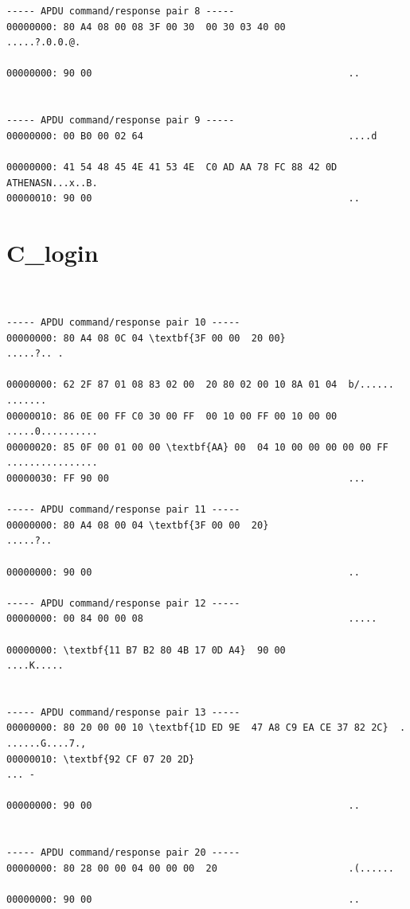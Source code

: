 \documentclass[bsc,frontabs,twoside,singlespacing,parskip,deptreport]{infthesis}     %
\begin{document}
\begin{appendices}
\begin{Verbatim}[commandchars=\\\{\}, fontsize=\small]
----- APDU command/response pair 8 -----
00000000: 80 A4 08 00 08 3F 00 30  00 30 03 40 00           .....?.0.0.@.

00000000: 90 00                                             ..


----- APDU command/response pair 9 -----
00000000: 00 B0 00 02 64                                    ....d

00000000: 41 54 48 45 4E 41 53 4E  C0 AD AA 78 FC 88 42 0D  ATHENASN...x..B.
00000010: 90 00                                             ..

\end{Verbatim}

\section{C\_login}
\begin{Verbatim}[commandchars=\\\{\}, fontsize=\small]


----- APDU command/response pair 10 -----
00000000: 80 A4 08 0C 04 \textbf{3F 00 00  20 00}                    .....?.. .

00000000: 62 2F 87 01 08 83 02 00  20 80 02 00 10 8A 01 04  b/...... .......
00000010: 86 0E 00 FF C0 30 00 FF  00 10 00 FF 00 10 00 00  .....0..........
00000020: 85 0F 00 01 00 00 \textbf{AA} 00  04 10 00 00 00 00 00 FF  ................
00000030: FF 90 00                                          ...

----- APDU command/response pair 11 -----
00000000: 80 A4 08 00 04 \textbf{3F 00 00  20}                       .....?.. 

00000000: 90 00                                             ..

----- APDU command/response pair 12 -----
00000000: 00 84 00 00 08                                    .....

00000000: \textbf{11 B7 B2 80 4B 17 0D A4}  90 00                    ....K.....


----- APDU command/response pair 13 -----
00000000: 80 20 00 00 10 \textbf{1D ED 9E  47 A8 C9 EA CE 37 82 2C}  . ......G....7.,
00000010: \textbf{92 CF 07 20 2D}                                    ... -

00000000: 90 00                                             ..


----- APDU command/response pair 20 -----
00000000: 80 28 00 00 04 00 00 00  20                       .(...... 

00000000: 90 00                                             ..


\end{Verbatim}
\end{appendices}
\end{document}
